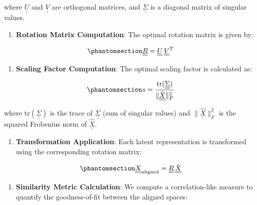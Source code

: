 \documentclass[
]{scrartcl}
\providecommand{\tightlist}{%
  \setlength{\itemsep}{0pt}\setlength{\parskip}{0pt}}\usepackage{longtable,booktabs,array}
\begin{document}
\begin{refsection}
where \(\underline{\underline{U}}\) and \(\underline{\underline{V}}\)
are orthogonal matrices, and \(\underline{\underline{\Sigma}}\) is a
diagonal matrix of singular values.

\begin{enumerate}
\def\labelenumi{\arabic{enumi}.}
\setcounter{enumi}{3}
\tightlist
\item
  \textbf{Rotation Matrix Computation}: The optimal rotation matrix is
  given by:
\end{enumerate}

\begin{equation}\phantomsection\label{eq-rotation}{
\underline{\underline{R}} = 
\underline{\underline{U}}\,
\underline{\underline{V}}^T
}\end{equation}

\begin{enumerate}
\def\labelenumi{\arabic{enumi}.}
\setcounter{enumi}{4}
\tightlist
\item
  \textbf{Scaling Factor Computation}: The optimal scaling factor is
  calculated as:
\end{enumerate}

\begin{equation}\phantomsection\label{eq-scaling}{
s = \frac{
        \text{tr}(\underline{\underline{\Sigma}})
    }{
        \|\hat{\underline{\underline{X}}}\|_F^2
    }
}\end{equation}

where \(\text{tr}(\underline{\underline{\Sigma}})\) is the trace of
\(\underline{\underline{\Sigma}}\) (sum of singular values) and
\(\|\hat{\underline{\underline{X}}}\|_F^2\) is the squared Frobenius
norm of \(\hat{\underline{\underline{X}}}\).

\begin{enumerate}
\def\labelenumi{\arabic{enumi}.}
\setcounter{enumi}{5}
\tightlist
\item
  \textbf{Transformation Application}: Each latent representation is
  transformed using the corresponding rotation matrix:
\end{enumerate}

\begin{equation}\phantomsection\label{eq-alignment}{
\underline{\underline{X}}_{\text{aligned}} = 
\underline{\underline{R}}\,\hat{\underline{\underline{X}}}
}\end{equation}

\begin{enumerate}
\def\labelenumi{\arabic{enumi}.}
\setcounter{enumi}{6}
\tightlist
\item
  \textbf{Similarity Metric Calculation}: We compute a correlation-like
  measure to quantify the goodness-of-fit between the aligned spaces:
\end{enumerate}


\end{refsection}
\end{document}

